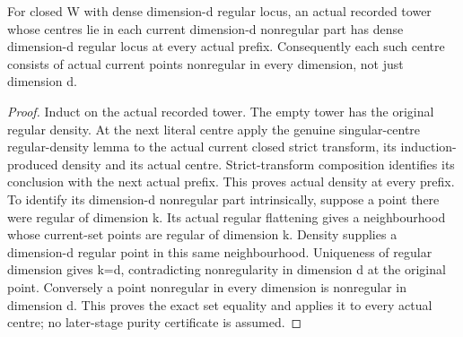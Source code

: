 \begin{lemma}
\label{hir:intrinsic-singular-stage-centres}
\leanok
For closed W with dense dimension-d regular locus, an actual recorded
tower whose centres lie in each current dimension-d nonregular part
has dense dimension-d regular locus at every actual prefix. Consequently
each such centre consists of actual current points nonregular in every
dimension, not just dimension d.
\end{lemma}
\begin{proof}
Induct on the actual recorded tower. The empty tower has the original
regular density. At the next literal centre apply the genuine
singular-centre regular-density lemma to the actual current closed
strict transform, its induction-produced density and its actual centre.
Strict-transform composition identifies its conclusion with the next
actual prefix. This proves actual density at every prefix.
To identify its dimension-d nonregular part intrinsically, suppose a
point there were regular of dimension k. Its actual regular flattening
gives a neighbourhood whose current-set points are regular of dimension k.
Density supplies a dimension-d regular point in this same neighbourhood.
Uniqueness of regular dimension gives k=d, contradicting nonregularity
in dimension d at the original point. Conversely a point nonregular
in every dimension is nonregular in dimension d. This proves the exact
set equality and applies it to every actual centre; no later-stage
purity certificate is assumed.
\end{proof}

